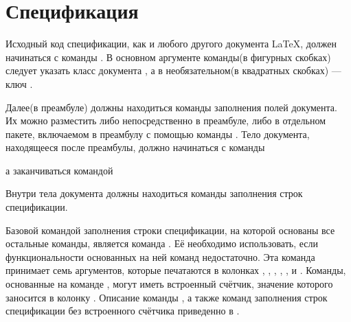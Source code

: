 
\section{Спецификация}

Исходный код спецификации, как и любого другого документа \LaTeX{}, должен
начинаться с команды . В основном аргументе
команды(в фигурных скобках) следует указать класс документа , а в
необязательном(в квадратных скобках) --- ключ .


Далее(в преамбуле) должны находиться команды заполнения полей документа. Их можно
разместить либо непосредственно в преамбуле, либо в отдельном пакете, включаемом в
преамбулу с помощью команды . Тело документа,
находящееся после преамбулы, должно начинаться с команды

\begin{pcbdoccode}

\end{pcbdoccode}

а заканчиваться командой

\begin{pcbdoccode}

\end{pcbdoccode}

%
%
%

Внутри тела документа должны находиться команды заполнения строк спецификации.

Базовой командой заполнения строки спецификации, на которой основаны все ос\-таль\-ные
команды, является команда . Её необходимо использовать,
если функциональности основанных на ней команд недостаточно. Эта команда принимает семь
аргументов, которые печатаются в колонках
, ,
, ,
,  и
. Команды, основанные на
команде , могут иметь встроенный счётчик, значение которого
заносится в колонку . Описание команды
, а также команд заполнения строк спецификации без
встроенного счётчика приведенно в .\sloppy

